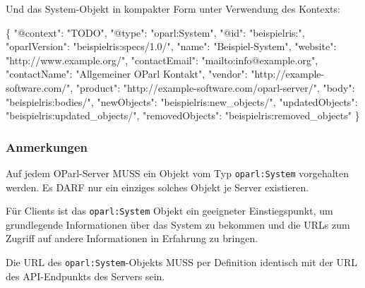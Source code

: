 \documentclass[,a4paper]{article}
\newenvironment{Shaded}{}{}
\newcommand{\DataTypeTok}[1]{\textcolor[rgb]{0.56,0.13,0.00}{{#1}}}
\newcommand{\StringTok}[1]{\textcolor[rgb]{0.25,0.44,0.63}{{#1}}}
\newcommand{\FunctionTok}[1]{\textcolor[rgb]{0.02,0.16,0.49}{{#1}}}
\begin{document}
Und das System-Objekt in kompakter Form unter Verwendung des Kontexts:

\begin{Shaded}
\begin{Highlighting}[]
\FunctionTok{\{}
    \DataTypeTok{"@context"}\FunctionTok{:} \StringTok{"TODO"}\FunctionTok{,}
    \DataTypeTok{"@type"}\FunctionTok{:} \StringTok{"oparl:System"}\FunctionTok{,}
    \DataTypeTok{"@id"}\FunctionTok{:} \StringTok{"beispielris:"}\FunctionTok{,}
    \DataTypeTok{"oparlVersion"}\FunctionTok{:} \StringTok{"beispielris:specs/1.0/"}\FunctionTok{,}
    \DataTypeTok{"name"}\FunctionTok{:} \StringTok{"Beispiel-System"}\FunctionTok{,}
    \DataTypeTok{"website"}\FunctionTok{:} \StringTok{"http://www.example.org/"}\FunctionTok{,}
    \DataTypeTok{"contactEmail"}\FunctionTok{:} \StringTok{"mailto:info@example.org"}\FunctionTok{,}
    \DataTypeTok{"contactName"}\FunctionTok{:} \StringTok{"Allgemeiner OParl Kontakt"}\FunctionTok{,}
    \DataTypeTok{"vendor"}\FunctionTok{:} \StringTok{"http://example-software.com/"}\FunctionTok{,}
    \DataTypeTok{"product"}\FunctionTok{:} \StringTok{"http://example-software.com/oparl-server/"}\FunctionTok{,}
    \DataTypeTok{"body"}\FunctionTok{:} \StringTok{"beispielris:bodies/"}\FunctionTok{,}
    \DataTypeTok{"newObjects"}\FunctionTok{:} \StringTok{"beispielris:new_objects/"}\FunctionTok{,}
    \DataTypeTok{"updatedObjects"}\FunctionTok{:} \StringTok{"beispielris:updated_objects/"}\FunctionTok{,}
    \DataTypeTok{"removedObjects"}\FunctionTok{:} \StringTok{"beispielris:removed_objects"}
\FunctionTok{\}}
\end{Highlighting}
\end{Shaded}

\subsubsection{Anmerkungen}\label{anmerkungen}

Auf jedem OParl-Server MUSS ein Objekt vom Typ \texttt{oparl:System}
vorgehalten werden. Es DARF nur ein einziges solches Objekt je Server
existieren.

Für Clients ist das \texttt{oparl:System} Objekt ein geeigneter
Einstiegspunkt, um grundlegende Informationen über das System zu
bekommen und die URLs zum Zugriff auf andere Informationen in Erfahrung
zu bringen.

Die URL des \texttt{oparl:System}-Objekts MUSS per Definition identisch
mit der URL des API-Endpunkts des Servers sein.
\end{document}
